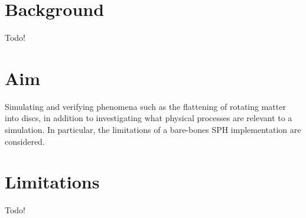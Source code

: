 \documentclass[../main.tex]{subfiles}
\begin{document}
\section{Background}
Todo!

\section{Aim}
Simulating and verifying phenomena such as the flattening of rotating matter into discs, in addition
to investigating what physical processes are relevant to a simulation. In particular, the
limitations of a bare-bones SPH implementation are considered.

\section{Limitations}
Todo!
\end{document}

